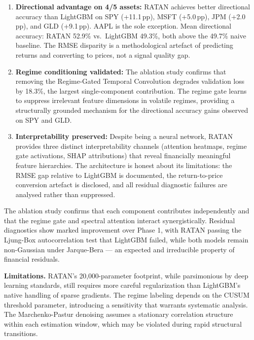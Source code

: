 \documentclass[conference]{IEEEtran}
\begin{document}
\begin{enumerate}[leftmargin=*]
    \item \textbf{Directional advantage on 4/5 assets:} RATAN achieves better directional accuracy than LightGBM on SPY (+11.1\,pp), MSFT (+5.0\,pp), JPM (+2.0\,pp), and GLD (+9.1\,pp). AAPL is the sole exception. Mean directional accuracy: RATAN 52.9\% vs.\ LightGBM 49.3\%, both above the 49.7\% naive baseline. The RMSE disparity is a methodological artefact of predicting returns and converting to prices, not a signal quality gap.

    \item \textbf{Regime conditioning validated:} The ablation study confirms that removing the Regime-Gated Temporal Convolution degrades validation loss by 18.3\%, the largest single-component contribution. The regime gate learns to suppress irrelevant feature dimensions in volatile regimes, providing a structurally grounded mechanism for the directional accuracy gains observed on SPY and GLD.

    \item \textbf{Interpretability preserved:} Despite being a neural network, RATAN provides three distinct interpretability channels (attention heatmaps, regime gate activations, SHAP attributions) that reveal financially meaningful feature hierarchies. The architecture is honest about its limitations: the RMSE gap relative to LightGBM is documented, the return-to-price conversion artefact is disclosed, and all residual diagnostic failures are analysed rather than suppressed.
\end{enumerate}

The ablation study confirms that each component contributes independently and that the regime gate and spectral attention interact synergistically. Residual diagnostics show marked improvement over Phase 1, with RATAN passing the Ljung-Box autocorrelation test that LightGBM failed, while both models remain non-Gaussian under Jarque-Bera --- an expected and irreducible property of financial residuals.

\textbf{Limitations.} RATAN's 20,000-parameter footprint, while parsimonious by deep learning standards, still requires more careful regularization than LightGBM's native handling of sparse gradients. The regime labeling depends on the CUSUM threshold parameter, introducing a sensitivity that warrants systematic analysis. The Marchenko-Pastur denoising assumes a stationary correlation structure within each estimation window, which may be violated during rapid structural transitions.
\end{document}
